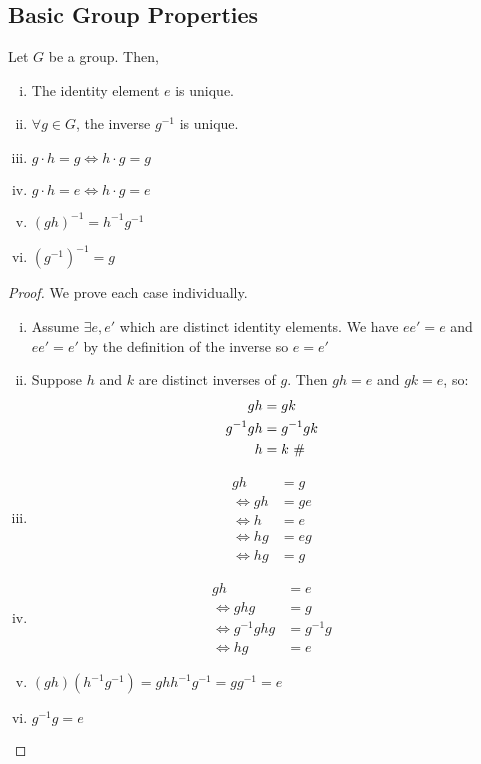 \documentclass{article}
\begin{document}
	\subsection{Basic Group Properties}
	\begin{proposition}
		Let $G$ be a group. Then,
		\begin{enumerate}[i.]
			\item The identity element $e$ is unique.
			\item $\forall g \in G$, the inverse $g^{-1}$ is unique.
			\item $g \cdot h = g \iff h \cdot g = g$
			\item $g \cdot h = e \iff h \cdot g = e$
			\item $(gh)^{-1} = h^{-1} g^{-1}$
			\item $(g^{-1})^{-1} = g$
		\end{enumerate}
	\end{proposition}
	\begin{proof}
		We prove each case individually.
		\begin{enumerate}[i.]
			\item Assume $\exists e, e'$ which are distinct identity elements. We have $e e' = e$ and $e e' = e'$ by the definition of the inverse so $e = e'$ \contradiction
			\item Suppose $h$ and $k$ are distinct inverses of $g$. Then $gh = e$ and $gk = e$, so:
			\begin{align*}
				gh &= gk \\
				g^{-1} gh &= g^{-1} gk \\
				h &= k \text{ $\#$}
			\end{align*}
			\item \begin{align*}
				gh &= g \\
				\iff gh &= ge \\
				\iff h &= e \\
				\iff hg &= eg \\
				\iff hg &= g
			\end{align*}
			\item \begin{align*}
				gh &= e \\
				\iff ghg &= g \\
				\iff g^{-1} ghg &= g^{-1}g \\
				\iff hg &= e
			\end{align*}
			\item $(gh) (h^{-1}g^{-1}) = g h h^{-1} g^{-1} = g g^{-1} = e$
			\item $g^{-1} g = e$
		\end{enumerate}
	\end{proof}
\end{document}
